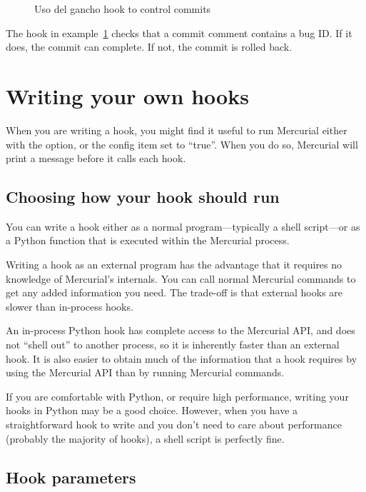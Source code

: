 \begin{figure}[ht]
  \caption{Uso del gancho  hook to control commits}
  \label{ex:hook:pretxncommit}
\end{figure}

The hook in example~\ref{ex:hook:pretxncommit} checks that a commit
comment contains a bug ID.  If it does, the commit can complete.  If
not, the commit is rolled back.

\section{Writing your own hooks}

When you are writing a hook, you might find it useful to run Mercurial
either with the  option, or the  config
item set to ``true''.  When you do so, Mercurial will print a message
before it calls each hook.

\subsection{Choosing how your hook should run}
\label{sec:hook:lang}

You can write a hook either as a normal program---typically a shell
script---or as a Python function that is executed within the Mercurial
process.

Writing a hook as an external program has the advantage that it
requires no knowledge of Mercurial's internals.  You can call normal
Mercurial commands to get any added information you need.  The
trade-off is that external hooks are slower than in-process hooks.

An in-process Python hook has complete access to the Mercurial API,
and does not ``shell out'' to another process, so it is inherently
faster than an external hook.  It is also easier to obtain much of the
information that a hook requires by using the Mercurial API than by
running Mercurial commands.

If you are comfortable with Python, or require high performance,
writing your hooks in Python may be a good choice.  However, when you
have a straightforward hook to write and you don't need to care about
performance (probably the majority of hooks), a shell script is
perfectly fine.

\subsection{Hook parameters}
\label{sec:hook:param}

